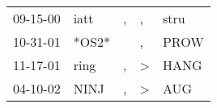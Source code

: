 \begin{supertabular}{lllll}
 09-15-00 &   iatt &  , &             , &  stru \\
 10-31-01 &  *OS2* &    &             , &  PROW \\
 11-17-01 &   ring &  , &  \textgreater &  HANG \\
 04-10-02 &   NINJ &  , &  \textgreater &   AUG \\
\end{supertabular}
